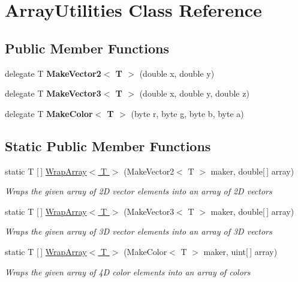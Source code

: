 \hypertarget{class_array_utilities}{}\section{Array\+Utilities Class Reference}
\label{class_array_utilities}
\subsection*{Public Member Functions}
\begin{DoxyCompactItemize}
\item 
\mbox{\label{class_array_utilities_ad2c612f67c0bbcca6fa70da574478c95}} 
delegate T {\bfseries Make\+Vector2$<$ T $>$} (double x, double y)
\item 
\mbox{\label{class_array_utilities_a0370ee277798118b042f8a90f33e3763}} 
delegate T {\bfseries Make\+Vector3$<$ T $>$} (double x, double y, double z)
\item 
\mbox{\label{class_array_utilities_ae78f020d0ee37ed80077e6fcbddcb328}} 
delegate T {\bfseries Make\+Color$<$ T $>$} (byte r, byte g, byte b, byte a)
\end{DoxyCompactItemize}
\subsection*{Static Public Member Functions}
\begin{DoxyCompactItemize}
\item 
static T \mbox{[}$\,$\mbox{]} \hyperlink{class_array_utilities_a068706b8c82301a0902908ed58740f67}{Wrap\+Array$<$ T $>$} (Make\+Vector2$<$ T $>$ maker, double\mbox{[}$\,$\mbox{]} array)
\begin{DoxyCompactList}\small\item\em Wraps the given array of 2D vector elements into an array of 2D vectors \end{DoxyCompactList}\item 
static T \mbox{[}$\,$\mbox{]} \hyperlink{class_array_utilities_ac24cf72faa81c79fa7f8d06aad8e098b}{Wrap\+Array$<$ T $>$} (Make\+Vector3$<$ T $>$ maker, double\mbox{[}$\,$\mbox{]} array)
\begin{DoxyCompactList}\small\item\em Wraps the given array of 3D vector elements into an array of 3D vectors \end{DoxyCompactList}\item 
static T \mbox{[}$\,$\mbox{]} \hyperlink{class_array_utilities_ac8824aadee75b2f0d64903876c666d19}{Wrap\+Array$<$ T $>$} (Make\+Color$<$ T $>$ maker, uint\mbox{[}$\,$\mbox{]} array)
\begin{DoxyCompactList}\small\item\em Wraps the given array of 4D color elements into an array of colors \end{DoxyCompactList}\end{DoxyCompactItemize}


